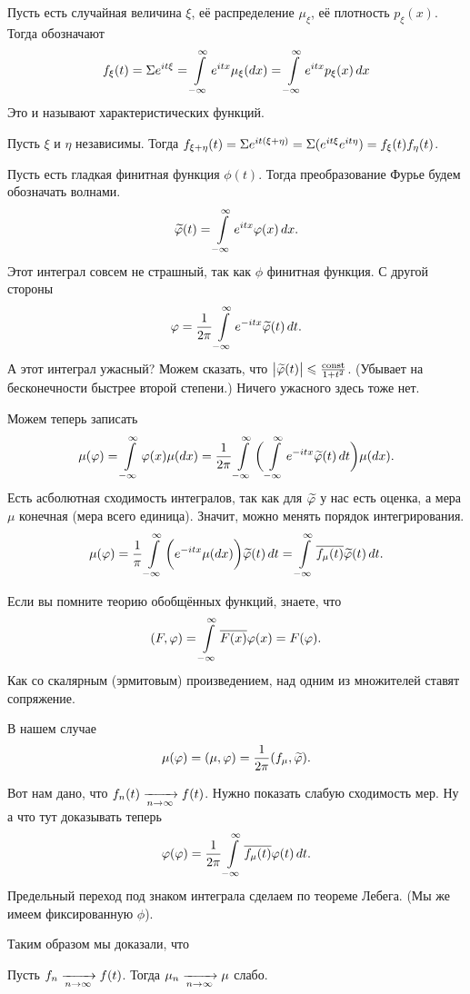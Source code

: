 \begin{Def}
Пусть есть случайная величина $\xi$, её распределение $\mu_\xi$, её плотность $p_\xi(x)$. Тогда обозначают
\[
  f_\xi(t) = \Sigma e^{it\xi} = \int\limits_{-\infty}^{\infty} e^{itx}\mu_\xi(dx) = \int\limits_{-\infty}^{\infty}e^{itx} p_\xi(x)\,dx
\]
Это и называют характеристических функций.
\end{Def}

\begin{Ut}
 Пусть $\xi$ и $\eta$ независимы. Тогда
  $f_{\xi+\eta}(t) = \Sigma e^{it(\xi+\eta)} = \Sigma (e^{it\xi} e^{it\eta}) = f_\xi(t) f_\eta(t)$.
\end{Ut}

Пусть есть гладкая финитная функция $\phi(t)$. Тогда преобразование Фурье будем обозначать волнами.
\[
  \widetilde{\varphi}{}(t) = \int\limits_{-\infty}^{\infty} e^{itx}\varphi(x)\,dx.
\]
Этот интеграл совсем не страшный, так как $\phi$ финитная функция. С другой стороны
\[
  \varphi = \frac1{2\pi} \int\limits_{-\infty}^{\infty} e^{-itx}\widetilde{\varphi}{}(t)\,dt.
\]
А этот интеграл ужасный? Можем сказать, что $\big|\widetilde{\varphi}{}(t)\big| \leqslant \frac{\operatorname{const}}{1+t^2}$. (Убывает на бесконечности быстрее второй степени.) Ничего ужасного здесь тоже нет.

Можем теперь записать
\[
  \mu(\varphi) = \int\limits_{-\infty}^{\infty} \varphi(x)\mu(dx) = \frac1{2\pi} \int\limits_{-\infty}^{\infty} \bigg(\int\limits_{-\infty}^{\infty} e^{-itx}\widetilde{\varphi}{}(t)\,dt\bigg)\mu(dx).
\]
Есть асболютная сходимость интегралов, так как для $\widetilde{\varphi}{}$ у нас есть оценка, а мера $\mu$ конечная (мера всего единица). Значит, можно менять порядок интегрирования.
\[
  \mu(\varphi) = \frac1{\pi} \int\limits_{-\infty}^{\infty} \bigg(e^{-itx}\mu(dx)\bigg) \widetilde{\varphi}{}(t)\,dt = 
  \int\limits_{-\infty}^{\infty} \overline{f_\mu(t)} \widetilde{\varphi}{}(t)\,dt.
\]

Если вы помните теорию обобщённых функций, знаете, что
\[
  (F,\varphi) = \int\limits_{-\infty}^{\infty} \overline{F(x)} \varphi(x) = F(\varphi).
\]
Как со скалярным (эрмитовым) произведением, над одним из множителей ставят сопряжение.

В нашем случае
\[
  \mu(\varphi) = (\mu,\varphi) = \frac1{2\pi} (f_\mu,\widetilde{\varphi}{}).
\]

Вот нам дано, что $f_n(t)\xrightarrow[n\rightarrow\infty]{} f(t)$. Нужно показать слабую сходимость мер. Ну а что тут доказывать теперь
\[
 \varphi(\varphi) = \frac1{2\pi}\int\limits_{-\infty}^\infty \overline{f_\mu(t)}\varphi(t)\,dt.
\]
Предельный переход под знаком интеграла сделаем по теореме Лебега. (Мы же имеем фиксированную $\phi$).

Таким образом мы доказали, что
\begin{Ut}
 Пусть $f_n\xrightarrow[n\rightarrow\infty]{} f(t)$. Тогда $\mu_n\xrightarrow[n\rightarrow\infty]{} \mu$ слабо.
\end{Ut}


